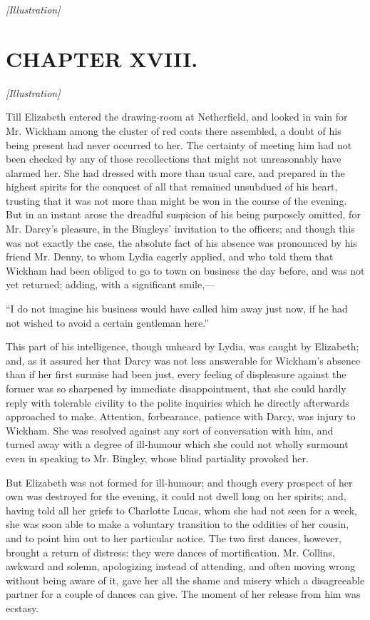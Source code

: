 \documentclass[12pt]{book}
\begin{document}
\emph{[Illustration]}

\chapter{CHAPTER XVIII.}

\emph{[Illustration]}

Till Elizabeth entered the drawing-room at Netherfield, and looked in vain for Mr. Wickham among the cluster of red coats there assembled, a doubt of his being present had never occurred to her. The certainty of meeting him had not been checked by any of those recollections that might not unreasonably have alarmed her. She had dressed with more than usual care, and prepared in the highest spirits for the conquest of all that remained unsubdued of his heart, trusting that it was not more than might be won in the course of the evening. But in an instant arose the dreadful suspicion of his being purposely omitted, for Mr. Darcy's pleasure, in the Bingleys' invitation to the officers; and though this was not exactly the case, the absolute fact of his absence was pronounced by his friend Mr. Denny, to whom Lydia eagerly applied, and who told them that Wickham had been obliged to go to town on business the day before, and was not yet returned; adding, with a significant smile,---

``I do not imagine his business would have called him away just now, if he had not wished to avoid a certain gentleman here.''

This part of his intelligence, though unheard by Lydia, was caught by Elizabeth; and, as it assured her that Darcy was not less answerable for Wickham's absence than if her first surmise had been just, every feeling of displeasure against the former was so sharpened by immediate disappointment, that she could hardly reply with tolerable civility to the polite inquiries which he directly afterwards approached to make. Attention, forbearance, patience with Darcy, was injury to Wickham. She was resolved against any sort of conversation with him, and turned away with a degree of ill-humour which she could not wholly surmount even in speaking to Mr. Bingley, whose blind partiality provoked her.

But Elizabeth was not formed for ill-humour; and though every prospect of her own was destroyed for the evening, it could not dwell long on her spirits; and, having told all her griefs to Charlotte Lucas, whom she had not seen for a week, she was soon able to make a voluntary transition to the oddities of her cousin, and to point him out to her particular notice. The two first dances, however, brought a return of distress: they were dances of mortification. Mr. Collins, awkward and solemn, apologizing instead of attending, and often moving wrong without being aware of it, gave her all the shame and misery which a disagreeable partner for a couple of dances can give. The moment of her release from him was ecstasy.
\end{document}
